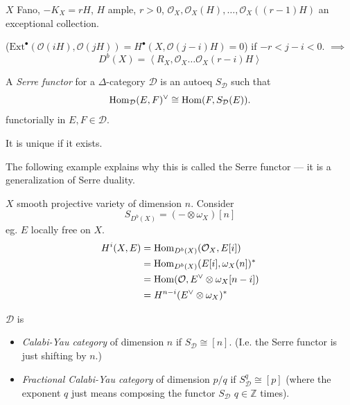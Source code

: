 \begin{example}
\label{example-Fano}
$X$ Fano, $-K_X=rH$, $H$ ample, $r>0$,
$\mathcal{O}_X,\mathcal{O}_X(H),\ldots,
\mathcal{O}_X((r-1)H)$
an exceptional collection.

($\text{Ext}^\bullet(\mathcal{O}(iH),
\mathcal{O}(jH))=
H^{\bullet}(X,\mathcal{O}(j-i)H)=0$) if
$-r<j-i<0$. $\implies$
$$
D^b(X)=\left\langle{}R_X,\mathcal{O}
_X\ldots\mathcal{O}_X(r-i)H\right\rangle{}
$$
\end{example}

\begin{definition}
\label{definition-Serre-functor}
A {\it Serre functor} for a $\Delta$-category
$\mathcal{D}$ is an autoeq $S_{\mathcal{D}}$
such that
$$
\mathop{\mathrm{Hom}}\nolimits_{\mathcal{D}}(E,F)^\vee \cong
\mathop{\mathrm{Hom}}\nolimits(F,S_{\mathcal{D}}(E)).
$$
functorially in $E,F \in \mathcal{D}$.
\end{definition}

\begin{remark}
\label{remark-uniqueness-of-Serre-functor}
It is unique if it exists.
\end{remark}

The following example explains why this is
called the Serre functor --- it is a
generalization of Serre duality.

\begin{example}
\label{nasak-label-012}
$X$ smooth projective variety of dimension
$n$. Consider
$$
S_{D^b(X)}=(-\otimes \omega_X)[n]
$$
eg. $E$ locally free on $X$.
$$
\begin{aligned}
H^{i}(X,E)&=\mathop{\mathrm{Hom}}\nolimits_{D^b(X)}(\mathcal{O}_X,E[i])
\\
& =\mathop{\mathrm{Hom}}\nolimits_{D^b(X)}(E[i],\omega_X(n])^* \\
&=\mathop{\mathrm{Hom}}\nolimits(\mathcal{O},E^\vee \otimes
\omega_X[n-i])\\
&=H^{n-i}(E^{\vee}\otimes \omega_X)^*
\end{aligned}
$$
\end{example}

\begin{definition}
\label{definition-Calabi-Yau-category}
$\mathcal{D}$ is
\begin{itemize}
\item {\it Calabi-Yau category} of dimension
$n$ if $S_{\mathcal{D}}\cong[n]$.
(I.e. the Serre functor is just shifting by
$n$.)
\item {\it Fractional Calabi-Yau category} of
dimension $p/q$ if
$S^q_{\mathcal{D}}\cong[p]$ (where the
exponent $q$ just means composing the functor
$S_{\mathcal{D}}$ $q \in \mathbb{Z}$ times).
\end{itemize}
\end{definition}

